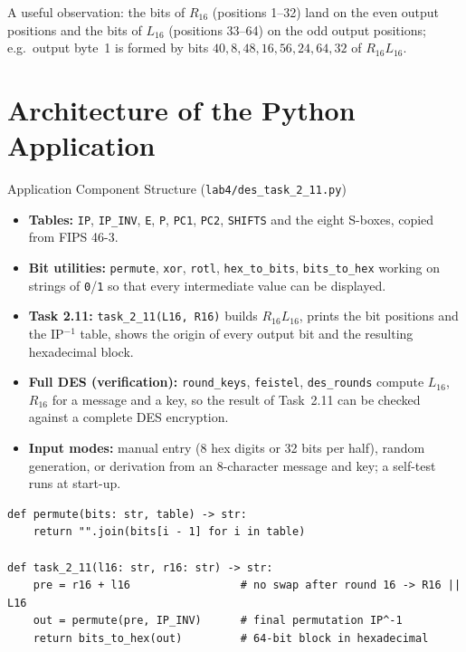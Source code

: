 \documentclass[12pt,a4paper]{article}
\begin{document}
A useful observation: the bits of $R_{16}$ (positions 1–32) land on the even output positions and
the bits of $L_{16}$ (positions 33–64) on the odd output positions; e.g.\ output byte~1 is formed by
bits $40,8,48,16,56,24,64,32$ of $R_{16}L_{16}$.

\section{Architecture of the Python Application}
\begin{infobox}{Application Component Structure (\texttt{lab4/des\_task\_2\_11.py})}
\begin{itemize}[leftmargin=*]
  \item \textbf{Tables:} \texttt{IP}, \texttt{IP\_INV}, \texttt{E}, \texttt{P}, \texttt{PC1},
        \texttt{PC2}, \texttt{SHIFTS} and the eight S-boxes, copied from FIPS 46-3.
  \item \textbf{Bit utilities:} \texttt{permute}, \texttt{xor}, \texttt{rotl},
        \texttt{hex\_to\_bits}, \texttt{bits\_to\_hex} working on strings of \texttt{0}/\texttt{1}
        so that every intermediate value can be displayed.
  \item \textbf{Task 2.11:} \texttt{task\_2\_11(L16, R16)} builds $R_{16}L_{16}$, prints the
        bit positions and the IP$^{-1}$ table, shows the origin of every output bit and the
        resulting hexadecimal block.
  \item \textbf{Full DES (verification):} \texttt{round\_keys}, \texttt{feistel},
        \texttt{des\_rounds} compute $L_{16}$, $R_{16}$ for a message and a key, so the result of
        Task~2.11 can be checked against a complete DES encryption.
  \item \textbf{Input modes:} manual entry (8 hex digits or 32 bits per half), random generation,
        or derivation from an 8-character message and key; a self-test runs at start-up.
\end{itemize}
\end{infobox}

\begin{lstlisting}[style=py, caption={Solving Task 2.11 (core logic)}]
def permute(bits: str, table) -> str:
    return "".join(bits[i - 1] for i in table)

def task_2_11(l16: str, r16: str) -> str:
    pre = r16 + l16                 # no swap after round 16 -> R16 || L16
    out = permute(pre, IP_INV)      # final permutation IP^-1
    return bits_to_hex(out)         # 64-bit block in hexadecimal
\end{lstlisting}
\end{document}

